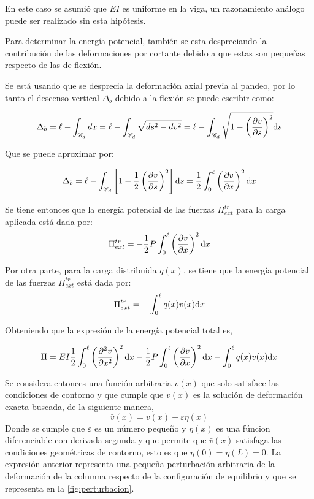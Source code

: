 En este caso se asumió que $EI$ es uniforme en la viga, un razonamiento análogo puede ser realizado sin esta hipótesis.

Para determinar la energía potencial, también se esta despreciando la contribución de las deformaciones por cortante debido a que estas son pequeñas respecto de las de flexión.

Se está usando que se desprecia la deformación axial previa al pandeo, por lo tanto el descenso vertical $\Delta_b$ debido a la flexión se puede escribir como:

\begin{equation}
\Delta_b = \ell - \int_{\mathscr{C}_d} dx = \ell - \int_{\mathscr{C}_d} \sqrt{ds^2-dv^2} = \ell - 
\int_{\mathscr{C}_d} \sqrt{1-\left(\frac{\partial v}{\partial s}\right)^2} {\text{d}} s
\end{equation}

Que se puede aproximar por:

\begin{equation}\label{eqn:deltab}
\Delta_b = \ell - \int_{\mathscr{C}_d} \left[1 - \frac{1}{2}\left(\frac{\partial v}{\partial s}\right)^2\right] {\text{d}} s = \frac{1}{2} \int_0^\ell \left(\frac{\partial v}{\partial x}\right)^2 {\text{d}} x
\end{equation}

Se tiene entonces que la energía potencial de las fuerzas $\Pi^{tr}_{ext}$ para la carga aplicada está dada por:
\begin{equation}
\Pi_{ext}^{tr} = -\frac{1}{2} P \int_0^\ell  \left(\frac{\partial v}{\partial x}\right)^2 {\text{d}} x
\end{equation}

Por otra parte, para la carga distribuida $q(x)$, se tiene que la energía potencial de las fuerzas $\Pi^{tr}_{ext}$ está dada por:
\begin{equation}
\Pi_{ext}^{tr} =
- \int_0^\ell q(x) v(x) {\text{d}} x
\end{equation}

Obteniendo que la expresión de la energía potencial total es,

\begin{equation}\label{eqn:energiatotal}
\Pi = E I \frac{1}{2} \int_0^\ell \left( \frac{\partial^2 v}{\partial x^2}\right)^2 {\text{d}} x -\frac{1}{2} P \int_0^\ell  \left(\frac{\partial v}{\partial x}\right)^2 {\text{d}} x - \int_0^\ell q(x) v(x) {\text{d}} x
\end{equation}

Se considera entonces una función arbitraria $\bar{v}(x)$ que solo satisface las condiciones de contorno y que cumple que $v(x)$ es la solución de deformación exacta buscada, de la siguiente manera,
\begin{equation}\label{eqn:funcionv}
\bar{v}(x)=v(x)+\varepsilon\eta(x)
\end{equation}
Donde se cumple que $\varepsilon$ es un número pequeño y $\eta(x)$ es una fúncion diferenciable con derivada segunda y que permite que $\bar{v}(x)$ satisfaga las condiciones geométricas de contorno, esto es que $\eta(0)=\eta(L)=0$.
La expresión anterior representa una pequeña perturbación arbitraria de la deformación de la columna respecto de la configuración de equilibrio y que se representa en la \autoref{fig:perturbacion}.

